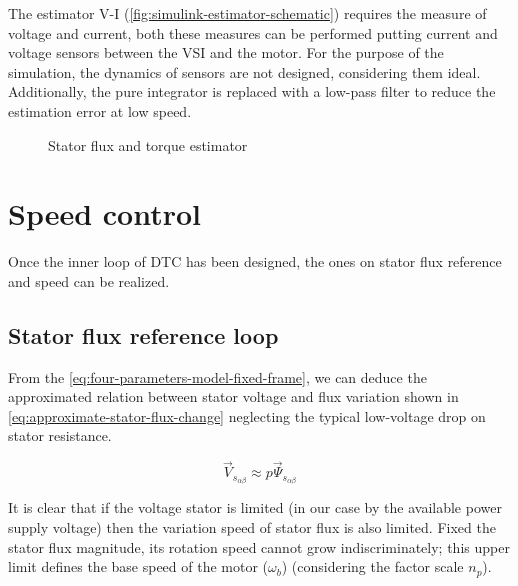 The estimator V-I (\autoref{fig:simulink-estimator-schematic}) requires the measure of voltage and current, both these measures can be performed putting current and voltage sensors between the VSI and the motor.
For the purpose of the simulation, the dynamics of sensors are not designed, considering them ideal.
Additionally, the pure integrator is replaced with a low-pass filter to reduce the estimation error at low speed.

\begin{figure}[h!]
	\centering
	\qquad
	\caption{Stator flux and torque estimator}
	\label{fig:simulink-estimator-schematic}
\end{figure}

\section{Speed control}

Once the inner loop of DTC has been designed, the ones on stator flux reference and speed can be realized.

\subsection{Stator flux reference loop}

From the \autoref{eq:four-parameters-model-fixed-frame}, we can deduce the approximated relation between stator voltage and flux variation shown in \autoref{eq:approximate-stator-flux-change} neglecting the typical low-voltage drop on stator resistance.

\begin{equation}
	\vec{V}_{s_{\alpha\beta}} \approx p \vec\Psi_{s_{\alpha\beta}}
	\label{eq:approximate-stator-flux-change}
\end{equation}

It is clear that if the voltage stator is limited (in our case by the available power supply voltage) then the variation speed of stator flux is also limited.
Fixed the stator flux magnitude, its rotation speed cannot grow indiscriminately; this upper limit defines the base speed of the motor ($\omega_b$) (considering the factor scale $n_p$).


